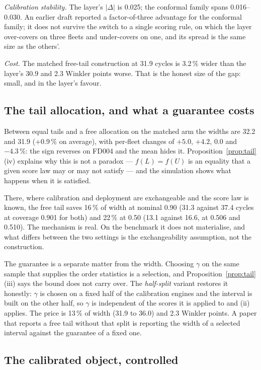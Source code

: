 \documentclass[journal]{IEEEtran}
\begin{document}
\emph{Calibration stability.} The layer's $|\Delta|$ is 0.025; the conformal family spans
0.016--0.030. An earlier draft reported a factor-of-three advantage for the conformal family;
it does not survive the switch to a single scoring rule, on which the layer over-covers on
three fleets and under-covers on one, and its spread is the same size as the others'.

\emph{Cost.} The matched free-tail construction at 31.9 cycles is 3.2\,\% wider than the
layer's 30.9 and 2.3 Winkler points worse. That is the honest size of the gap: small, and in
the layer's favour.

\subsection{The tail allocation, and what a guarantee costs}\label{sec:tail}

Between equal tails and a free allocation on the matched arm the widths are 32.2 and 31.9
(+0.9\,\% on average), with per-fleet changes of $+5.0$, $+4.2$, $0.0$ and $-4.3\,\%$: the sign
reverses on FD004 and the mean hides it. Proposition~\ref{prop:tail}(iv) explains why this is
not a paradox --- $f(L)=f(U)$ is an equality that a given score law may or may not satisfy ---
and the simulation shows what happens when it is satisfied.

There, where calibration and deployment are exchangeable and the score law is known, the free
tail saves 16\,\% of width at nominal 0.90 (31.3 against 37.4 cycles at coverage 0.901 for
both) and 22\,\% at 0.50 (13.1 against 16.6, at 0.506 and 0.510). The mechanism is real. On the
benchmark it does not materialise, and what differs between the two settings is the
exchangeability assumption, not the construction.

The guarantee is a separate matter from the width. Choosing $\gamma$ on the same sample that
supplies the order statistics is a selection, and Proposition~\ref{prop:tail}(iii) says the
bound does not carry over. The \emph{half-split} variant restores it honestly: $\gamma$ is
chosen on a fixed half of the calibration engines and the interval is built on the other half,
so $\gamma$ is independent of the scores it is applied to and (ii) applies. The price is
13\,\% of width (31.9 to 36.0) and 2.3 Winkler points. A paper that reports a free tail without
that split is reporting the width of a selected interval against the guarantee of a fixed one.

\subsection{The calibrated object, controlled}\label{sec:objectexp}
\end{document}
